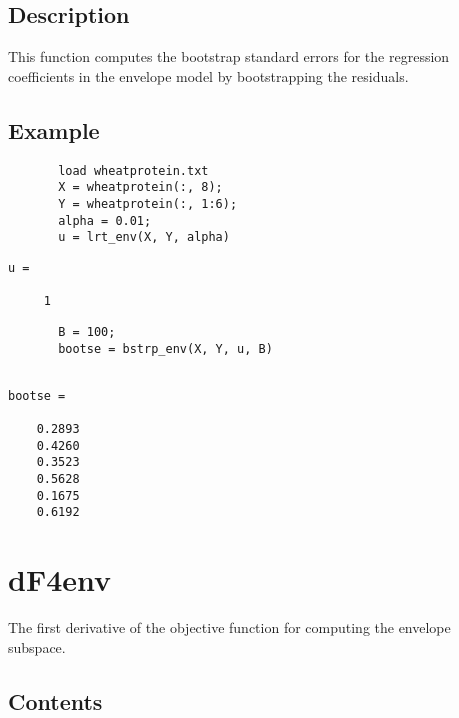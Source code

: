 \documentclass[a4paper,11pt,openany]{memoir}
\begin{document}
\subsection*{Description}

\begin{par}
This function computes the bootstrap standard errors for the regression coefficients in the envelope model by bootstrapping the residuals.
\end{par} \vspace{1em}


\subsection*{Example}


\begin{verbatim}       load wheatprotein.txt
       X = wheatprotein(:, 8);
       Y = wheatprotein(:, 1:6);
       alpha = 0.01;
       u = lrt_env(X, Y, alpha)
\end{verbatim} \rmfamily
\color{black}
\color{lightgray}\ttfamily \begin{verbatim}
u =

     1
\end{verbatim} \rmfamily
\color{black}
        \begin{verbatim}
       B = 100;
       bootse = bstrp_env(X, Y, u, B)\end{verbatim}
    
        \color{lightgray}\ttfamily \begin{verbatim}

bootse =

    0.2893
    0.4260
    0.3523
    0.5628
    0.1675
    0.6192

\end{verbatim} \rmfamily
\color{black}
    


\newpage


\rmfamily
\color{black}\section{dF4env}

\begin{par}
The first derivative of the objective function for computing the envelope subspace.
\end{par} \vspace{1em}

\subsection*{Contents}
\end{document}
